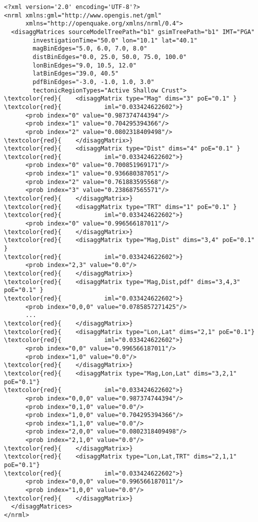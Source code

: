 \begin{Verbatim}[frame=single, commandchars=\\\{\}, fontsize=\small]
<?xml version='2.0' encoding='UTF-8'?>
<nrml xmlns:gml="http://www.opengis.net/gml"
      xmlns="http://openquake.org/xmlns/nrml/0.4">
  <disaggMatrices sourceModelTreePath="b1" gsimTreePath="b1" IMT="PGA"
        investigationTime="50.0" lon="10.1" lat="40.1"
        magBinEdges="5.0, 6.0, 7.0, 8.0"
        distBinEdges="0.0, 25.0, 50.0, 75.0, 100.0"
        lonBinEdges="9.0, 10.5, 12.0"
        latBinEdges="39.0, 40.5"
        pdfBinEdges="-3.0, -1.0, 1.0, 3.0"
        tectonicRegionTypes="Active Shallow Crust">
\textcolor{red}{    <disaggMatrix type="Mag" dims="3" poE="0.1" }
\textcolor{red}{            iml="0.033424622602">}
      <prob index="0" value="0.987374744394"/>
      <prob index="1" value="0.704295394366"/>
      <prob index="2" value="0.0802318409498"/>
\textcolor{red}{    </disaggMatrix>}
\textcolor{red}{    <disaggMatrix type="Dist" dims="4" poE="0.1" }
\textcolor{red}{            iml="0.033424622602">}
      <prob index="0" value="0.700851969171"/>
      <prob index="1" value="0.936680387051"/>
      <prob index="2" value="0.761883595568"/>
      <prob index="3" value="0.238687565571"/>
\textcolor{red}{    </disaggMatrix>}
\textcolor{red}{    <disaggMatrix type="TRT" dims="1" poE="0.1" }
\textcolor{red}{            iml="0.033424622602">}
      <prob index="0" value="0.996566187011"/>
\textcolor{red}{    </disaggMatrix>}
\textcolor{red}{    <disaggMatrix type="Mag,Dist" dims="3,4" poE="0.1" }
\textcolor{red}{            iml="0.033424622602">}
      <prob index="2,3" value="0.0"/>
\textcolor{red}{    </disaggMatrix>}
\textcolor{red}{    <disaggMatrix type="Mag,Dist,pdf" dims="3,4,3" poE="0.1" }
\textcolor{red}{            iml="0.033424622602">}
      <prob index="0,0,0" value="0.0785857271425"/>
      ...
\textcolor{red}{    </disaggMatrix>}
\textcolor{red}{    <disaggMatrix type="Lon,Lat" dims="2,1" poE="0.1"}
\textcolor{red}{            iml="0.033424622602">}
      <prob index="0,0" value="0.996566187011"/>
      <prob index="1,0" value="0.0"/>
\textcolor{red}{    </disaggMatrix>}
\textcolor{red}{    <disaggMatrix type="Mag,Lon,Lat" dims="3,2,1" poE="0.1"}
\textcolor{red}{            iml="0.033424622602">}
      <prob index="0,0,0" value="0.987374744394"/>
      <prob index="0,1,0" value="0.0"/>
      <prob index="1,0,0" value="0.704295394366"/>
      <prob index="1,1,0" value="0.0"/>
      <prob index="2,0,0" value="0.0802318409498"/>
      <prob index="2,1,0" value="0.0"/>
\textcolor{red}{    </disaggMatrix>}
\textcolor{red}{    <disaggMatrix type="Lon,Lat,TRT" dims="2,1,1" poE="0.1"}
\textcolor{red}{            iml="0.033424622602">}
      <prob index="0,0,0" value="0.996566187011"/>
      <prob index="1,0,0" value="0.0"/>
\textcolor{red}{    </disaggMatrix>}
  </disaggMatrices>
</nrml>
\end{Verbatim}